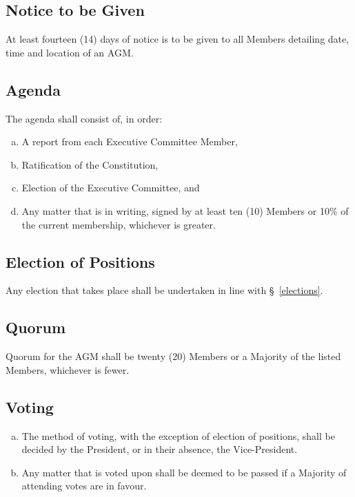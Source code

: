 \documentclass[a4paper,12pt]{article}
\begin{document}
\subsection{Notice to be Given}

At least fourteen (14) days of notice is to be given to all Members detailing date, time and location of an AGM.

\subsection{Agenda}

The agenda shall consist of, in order:

\begin{enumerate}[a)]
	\item A report from each Executive Committee Member,
	\item Ratification of the Constitution,
	\item Election of the Executive Committee, and
	\item Any matter that is in writing, signed by at least ten (10) Members or 10\% of the current membership, whichever is greater.
\end{enumerate}

\subsection{Election of Positions}

Any election that takes place shall be undertaken in line with \S~\ref{elections}.

\subsection{Quorum}

Quorum for the AGM shall be twenty (20) Members or a Majority of the listed Members, whichever is fewer.

\subsection{Voting}

\begin{enumerate}[a)]
	\item The method of voting, with the exception of election of positions, shall be decided by the President, or in their absence, the Vice-President.
	\item Any matter that is voted upon shall be deemed to be passed if a Majority of attending votes are in favour.
\end{enumerate}
\end{document}
